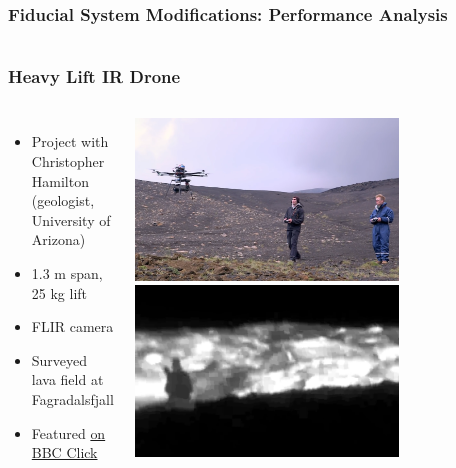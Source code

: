 \documentclass[aspectratio=169]{rubeamer}
\begin{document}
\begin{frame}
  \frametitle{Fiducial System Modifications: Performance Analysis}
  \begin{columns}
    \centering
  \end{columns}
\end{frame}

\begin{frame}
  \frametitle{Heavy Lift IR Drone}
  \begin{columns}
    \begin{itemize}
      \item Project with Christopher Hamilton (geologist, University of Arizona)
      \item 1.3 m span, 25 kg lift
      \item FLIR camera
      \item Surveyed lava field at Fagradalsfjall
      \item Featured \href{https://youtu.be/6SIgFPhhRPE?t=1208}{\color{blue}on BBC Click}
    \end{itemize}
    \centering
    \includegraphics[width=0.7\textwidth]{ir_drone_in_flight}
    \includegraphics[width=0.7\textwidth]{ir_drone_ir_stillframe}
  \end{columns}
\end{frame}
\end{document}
